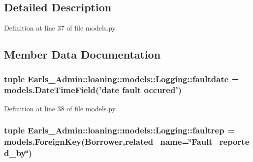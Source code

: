 \subsection{Detailed Description}


Definition at line 37 of file models.py.

\subsection{Member Data Documentation}
\hypertarget{classEarls__Admin_1_1loaning_1_1models_1_1Logging_4650b5b238266461bb40ee5470326fee}{
\subsubsection[faultdate]{\setlength{\rightskip}{0pt plus 5cm}tuple {\bf Earls\_\-Admin::loaning::models::Logging::faultdate} = models.DateTimeField('date {\bf fault} occured')}}
\label{classEarls__Admin_1_1loaning_1_1models_1_1Logging_4650b5b238266461bb40ee5470326fee}




Definition at line 38 of file models.py.\hypertarget{classEarls__Admin_1_1loaning_1_1models_1_1Logging_fe3d4ddd3051413989da3f0293057363}{
\subsubsection[faultrep]{\setlength{\rightskip}{0pt plus 5cm}tuple {\bf Earls\_\-Admin::loaning::models::Logging::faultrep} = models.ForeignKey({\bf Borrower},related\_\-name=\char`\"{}Fault\_\-reported\_\-by\char`\"{})}}
\label{classEarls__Admin_1_1loaning_1_1models_1_1Logging_fe3d4ddd3051413989da3f0293057363}




